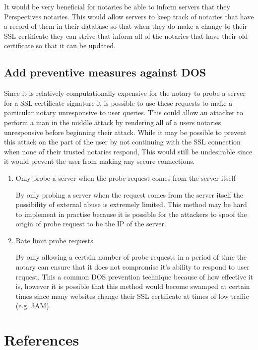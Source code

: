 \documentclass[preprint,review,12pt]{elsarticle}
\begin{document}
It would be very beneficial for notaries be able to inform servers that they
Perspectives notaries. This would allow servers to keep track of notaries
that have a record of them in their database so that when they do make a
change to their SSL certificate they can strive that inform all of the
notaries that have their old certificate so that it can be updated.

\subsection{Add preventive measures against DOS}

Since it is relatively computationally expensive for the notary to probe a
server for a SSL certificate signature it is possible to use these requests to
make a particular notary unresponsive to user queries. This could allow an
attacker to perform a man in the middle attack by rendering all of a users
notaries unresponsive before beginning their attack. While it may be possible
to prevent this attack on the part of the user by not continuing with the SSL
connection when none of their trusted notaries respond, This would still be
undesirable since it would prevent the user from making any secure connections.

\begin{enumerate}
    \item {Only probe a server when the probe request comes from the server itself}

        By only probing a server when the request comes from the server itself
        the possibility of external abuse is extremely limited. This method may
        be hard to implement in practise because it is possible for the
        attackers to spoof the origin of probe request to be the IP of the
        server.

    \item {Rate limit probe requests}

        By only allowing a certain number of probe requests in a period of time
        the notary can ensure that it does not compromise it's ability to
        respond to user request. This a common DOS prevention technique because
        of how effective it is, however it is possible that this method would
        become swamped at certain times since many websites change their SSL
        certificate at times of low traffic (e.g. 3AM).

\end{enumerate}

\section{References}
\label{references}
\nocite{*}


\end{document}
